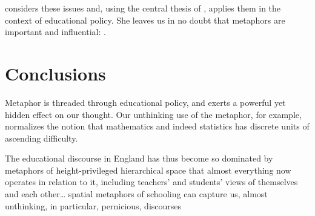 \citeauthor{sfard1998} considers these issues and, using the central
thesis of \citeauthor{lakoff1980}, applies them in the context of
educational policy.  She leaves us in no doubt that metaphors are
important and influential: .

\section{Conclusions}

Metaphor is threaded through educational policy, and exerts a powerful
yet hidden effect on our thought.  Our unthinking use of the
 metaphor, for example, normalizes the notion that
mathematics and indeed statistics has discrete units of ascending
difficulty.





\begin{singlespace}
\epigraph{The educational discourse in England has thus become so
  dominated by metaphors of height-privileged hierarchical space that
  almost everything now operates in relation to it, including
  teachers' and students' views of themselves and each other\ldots
  spatial metaphors of schooling can capture us, almost unthinking, in
  particular, pernicious, discourses}{}
\end{singlespace}
